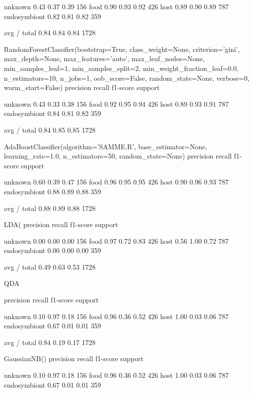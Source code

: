 unknown       0.43      0.37      0.39       156
food       0.90      0.93      0.92       426
host       0.89      0.90      0.89       787
endosymbiont       0.82      0.81      0.82       359

avg / total       0.84      0.84      0.84      1728

RandomForestClassifier(bootstrap=True, class_weight=None, criterion='gini',
max_depth=None, max_features='auto', max_leaf_nodes=None,
min_samples_leaf=1, min_samples_split=2,
min_weight_fraction_leaf=0.0, n_estimators=10, n_jobs=1,
oob_score=False, random_state=None, verbose=0,
warm_start=False)
precision    recall  f1-score   support

unknown       0.43      0.33      0.38       156
food       0.92      0.95      0.94       426
host       0.89      0.93      0.91       787
endosymbiont       0.84      0.81      0.82       359

avg / total       0.84      0.85      0.85      1728

AdaBoostClassifier(algorithm='SAMME.R', base_estimator=None,
learning_rate=1.0, n_estimators=50, random_state=None)
precision    recall  f1-score   support

unknown       0.60      0.39      0.47       156
food       0.96      0.95      0.95       426
host       0.90      0.96      0.93       787
endosymbiont       0.88      0.89      0.88       359

avg / total       0.88      0.89      0.88      1728

LDA(
precision    recall  f1-score   support

unknown       0.00      0.00      0.00       156
food       0.97      0.72      0.83       426
host       0.56      1.00      0.72       787
endosymbiont       0.00      0.00      0.00       359

avg / total       0.49      0.63      0.53      1728

QDA

precision    recall  f1-score   support

unknown       0.10      0.97      0.18       156
food       0.96      0.36      0.52       426
host       1.00      0.03      0.06       787
endosymbiont       0.67      0.01      0.01       359

avg / total       0.84      0.19      0.17      1728

GaussianNB()
precision    recall  f1-score   support

unknown       0.10      0.97      0.18       156
food       0.96      0.36      0.52       426
host       1.00      0.03      0.06       787
endosymbiont       0.67      0.01      0.01       359

